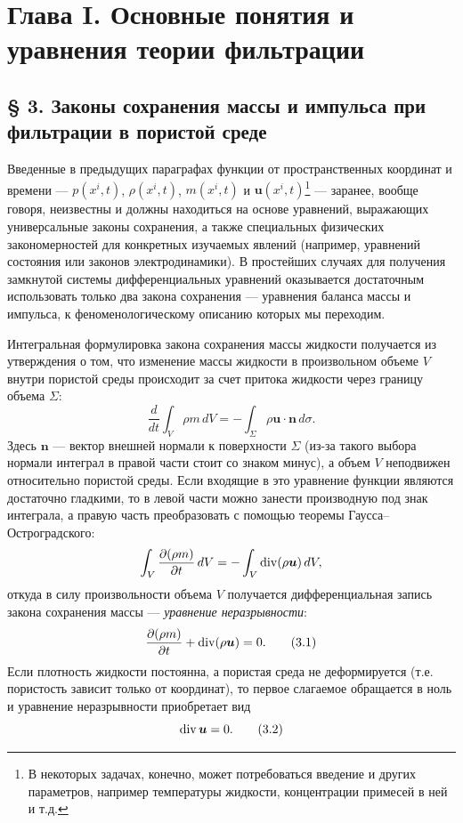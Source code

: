 \section*{Глава I. Основные понятия и уравнения теории фильтрации}
\subsection*{§ 3. Законы сохранения массы и импульса при фильтрации в пористой среде}
\label{q2:sec-3}
\setcounter{footnote}{0}
Введенные в предыдущих параграфах функции от пространственных координат и времени --- $p(x^i,t)$, $\rho(x^i,t)$, $m(x^i,t)$ и $\boldsymbol{u}(x^i,t)$\footnote{В некоторых задачах, конечно, может потребоваться введение и других параметров, например температуры жидкости, концентрации примесей в ней и т.д.} --- заранее, вообще говоря, неизвестны и должны находиться на основе уравнений, выражающих универсальные законы сохранения, а также специальных физических закономерностей для конкретных изучаемых явлений (например, уравнений состояния или законов электродинамики). В простейших случаях
для получения замкнутой системы дифференциальных уравнений оказывается достаточным использовать только два закона сохранения --- уравнения баланса массы и импульса, к феноменологическому описанию которых мы переходим.

Интегральная формулировка закона сохранения массы жидкости получается из утверждения о том, что изменение массы жидкости в произвольном объеме $V$ внутри пористой среды происходит за счет притока жидкости через границу объема $\Sigma$:
\[
\frac{d}{dt}\int_V\rho m\,dV=-\int_\Sigma\rho\boldsymbol{u}\cdot\boldsymbol{n}\,d\sigma.
\]
Здесь $\boldsymbol{n}$ --- вектор внешней нормали к поверхности $\Sigma$ (из-за такого выбора нормали интеграл в правой части стоит со знаком минус), а объем $V$ неподвижен относительно пористой среды. Если входящие в это уравнение функции являются достаточно гладкими, то в левой части можно занести производную под знак интеграла, а правую часть преобразовать с помощью теоремы Гаусса--Остроградского:
\[
\int_V\frac{\partial(\rho m)}{\partial t}\,dV=-\int_V\operatorname{div}(\rho\boldsymbol{u})\,dV,
\]
откуда в силу произвольности объема $V$ получается дифференциальная запись закона сохранения массы --- \textit{уравнение неразрывности}:
\begin{equation}
\frac{\partial(\rho m)}{\partial t}+\operatorname{div}(\rho\boldsymbol{u})=0.
\tag{3.1}\label{q2:eq-3-1}
\end{equation}
Если плотность жидкости постоянна, а пористая среда не деформируется (т.е. пористость зависит только от координат), то первое слагаемое обращается в ноль и уравнение неразрывности приобретает вид
\begin{equation}
\operatorname{div}\boldsymbol{u}=0.
\tag{3.2}\label{q2:eq-3-2}
\end{equation}

